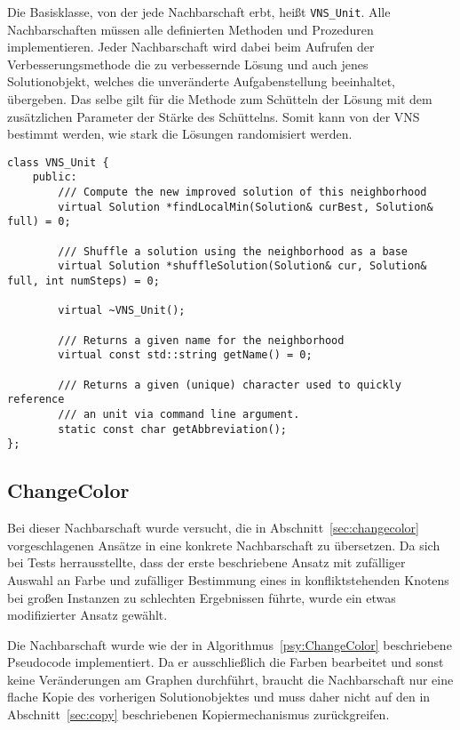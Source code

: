 Die Basisklasse, von der jede Nachbarschaft erbt, heißt \texttt{VNS\_Unit}. Alle Nachbarschaften müssen alle definierten Methoden und Prozeduren implementieren. Jeder Nachbarschaft wird dabei beim Aufrufen der
Verbesserungsmethode die zu verbessernde Lösung und auch jenes Solutionobjekt, welches die unveränderte Aufgabenstellung beeinhaltet, übergeben. Das selbe gilt für die Methode zum Schütteln der Lösung mit dem
zusätzlichen Parameter der Stärke des Schüttelns. Somit kann von der VNS bestimmt werden, wie stark die Lösungen randomisiert werden. 

\singlespacing
\begin{lstlisting}[caption={Signatur der Basisklasse \texttt{VNS\_Unit}, von welcher alle Nachbarschaften erben},label={lst:vnsunit}]
class VNS_Unit {
	public:
		/// Compute the new improved solution of this neighborhood
		virtual Solution *findLocalMin(Solution& curBest, Solution& full) = 0;

		/// Shuffle a solution using the neighborhood as a base
		virtual Solution *shuffleSolution(Solution& cur, Solution& full, int numSteps) = 0;

		virtual ~VNS_Unit();

		/// Returns a given name for the neighborhood
		virtual const std::string getName() = 0;

		/// Returns a given (unique) character used to quickly reference
		/// an unit via command line argument.
		static const char getAbbreviation();
};
\end{lstlisting}

\subsection{ChangeColor}
Bei dieser Nachbarschaft wurde versucht, die in Abschnitt~\ref{sec:changecolor} vorgeschlagenen Ansätze in eine konkrete Nachbarschaft zu übersetzen. Da sich bei Tests herrausstellte, dass der erste beschriebene Ansatz
mit zufälliger Auswahl an Farbe und zufälliger Bestimmung eines in konfliktstehenden Knotens bei großen Instanzen zu schlechten Ergebnissen führte, wurde ein etwas modifizierter Ansatz gewählt.

Die Nachbarschaft wurde wie der in Algorithmus~\ref{psy:ChangeColor} beschriebene Pseudocode implementiert. Da er ausschließlich die Farben bearbeitet und sonst keine Veränderungen am Graphen durchführt,
braucht die Nachbarschaft nur eine flache Kopie des vorherigen Solutionobjektes und muss daher nicht auf den in Abschnitt~\ref{sec:copy} beschriebenen Kopiermechanismus zurückgreifen. 

